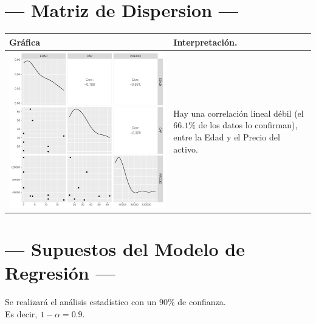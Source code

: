 \documentclass{article}
\begin{document}
\section{\centering --- Matriz de Dispersion ---} %
\begin{center}
  \begin{tabular}{|p{11cm}|p{5cm}|}
    \hline
    Gráfica & Interpretación. \\ \hline 
    \begin{minipage}{\textwidth}
    \includegraphics[width= 0.5 \linewidth, page=1]{r/Rplots.pdf}
    \end{minipage} 
    &
		Hay una correlación lineal débil (el \(66.1\%\) de los datos lo confirman),
		entre la Edad y el Precio del activo.
		\\ \hline 
  \end{tabular}
\end{center} 

\newpage

\section{\centering --- Supuestos del Modelo de Regresión ---} %

Se realizará el análisis estadístico con un \(90\%\) de confianza. \\ 
Es decir, \(1- \alpha = 0.9\).
\end{document}
